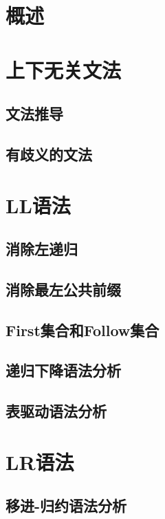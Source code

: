 \documentclass[cn,11pt,chinese]{elegantbook}
\begin{document}
\section{概述}

\section{上下无关文法}

\subsection{文法推导}

\subsection{有歧义的文法}

\section{LL语法}

\subsection{消除左递归}

\subsection{消除最左公共前缀}

\subsection{First集合和Follow集合}

\subsection{递归下降语法分析}

\subsection{表驱动语法分析}

\section{LR语法}

\subsection{移进-归约语法分析}
\end{document}
